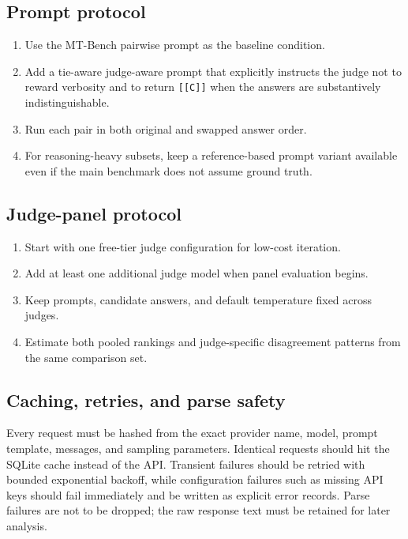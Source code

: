 \documentclass{article}
\begin{document}
\begin{bibunit}[unsrtnat]
\subsection{Prompt protocol}

\begin{enumerate}[leftmargin=1.5em]
  \item Use the MT-Bench pairwise prompt as the baseline condition.
  \item Add a tie-aware judge-aware prompt that explicitly instructs the judge not to reward verbosity and to return \texttt{[[C]]} when the answers are substantively indistinguishable.
  \item Run each pair in both original and swapped answer order.
  \item For reasoning-heavy subsets, keep a reference-based prompt variant available even if the main benchmark does not assume ground truth.
\end{enumerate}

\subsection{Judge-panel protocol}

\begin{enumerate}[leftmargin=1.5em]
  \item Start with one free-tier judge configuration for low-cost iteration.
  \item Add at least one additional judge model when panel evaluation begins.
  \item Keep prompts, candidate answers, and default temperature fixed across judges.
  \item Estimate both pooled rankings and judge-specific disagreement patterns from the same comparison set.
\end{enumerate}

\subsection{Caching, retries, and parse safety}

Every request must be hashed from the exact provider name, model, prompt template, messages, and sampling parameters. Identical requests should hit the SQLite cache instead of the API. Transient failures should be retried with bounded exponential backoff, while configuration failures such as missing API keys should fail immediately and be written as explicit error records. Parse failures are not to be dropped; the raw response text must be retained for later analysis.


\end{bibunit}
\end{document}
